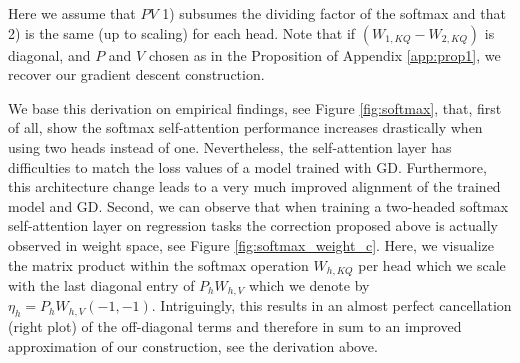 \documentclass{article}
\theoremstyle{plain}
\theoremstyle{definition}
\theoremstyle{remark}
\begin{document}
Here we assume that $PV$ 1) subsumes the dividing factor of the softmax and that 2) is the same (up to scaling) for each head. Note that if $(W_{1,KQ} - W_{2,KQ})$ is diagonal, and $P$ and $V$ chosen as in the Proposition of Appendix \ref{app:prop1}, we recover our gradient descent construction.

We base this derivation on empirical findings, see Figure \ref{fig:softmax}, that, first of all, show the softmax self-attention performance increases drastically when using two heads instead of one. Nevertheless, the self-attention layer has difficulties to match the loss values of a model trained with GD. Furthermore, this architecture change leads to a very much improved alignment of the trained model and GD. Second, we can observe that when training a two-headed softmax self-attention layer on regression tasks the correction proposed above is actually observed in weight space, see Figure \ref{fig:softmax_weight_c}. Here, we visualize the matrix product within the softmax operation $W_{h, KQ}$ per head which we scale with the last diagonal entry of $P_hW_{h,V}$ which we denote by $\eta_h=P_hW_{h,V}(-1, -1)$. Intriguingly, this results in an almost perfect cancellation (right plot) of the off-diagonal terms and therefore in sum to an improved approximation of our construction, see the derivation above.

\end{document}
